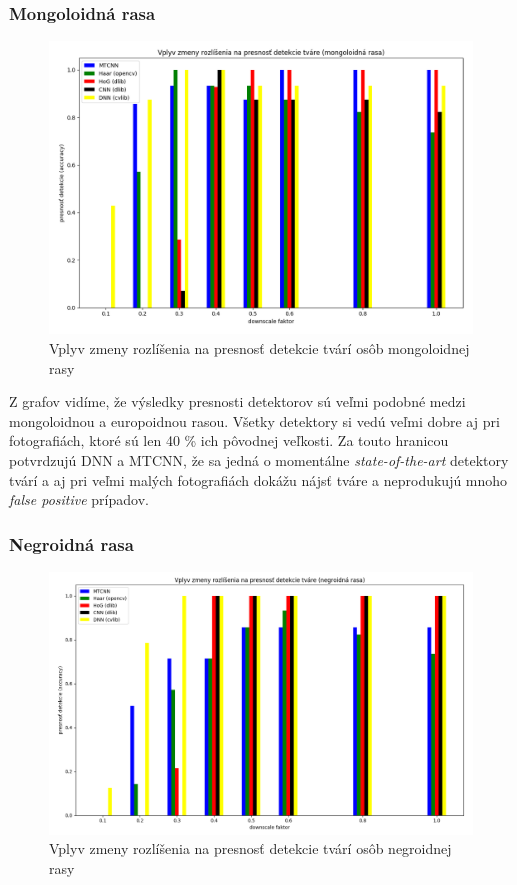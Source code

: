 \documentclass[]{article}
\begin{document}
	\newpage
	
	\subsubsection*{Mongoloidná rasa}
	\begin{figure}[h!]
		\includegraphics[width=\textwidth]{Vysledky_rozslisenie/mongo/Figure_1.png}
		\caption{Vplyv zmeny rozlíšenia na presnosť detekcie tvárí osôb mongoloidnej rasy}
	\end{figure}

	Z grafov vidíme, že výsledky presnosti detektorov sú veľmi podobné medzi mongoloidnou a europoidnou rasou. Všetky detektory si vedú veľmi dobre aj pri fotografiách, ktoré sú len 40 \% ich pôvodnej veľkosti. Za touto hranicou potvrdzujú DNN a MTCNN, že sa jedná o momentálne \textit{state-of-the-art} detektory tvárí a aj pri veľmi malých fotografiách dokážu nájsť tváre a neprodukujú mnoho \textit{false positive} prípadov.

	\newpage
	
	\subsubsection*{Negroidná rasa}
	\begin{figure}[h!]
		\includegraphics[width=\textwidth]{Vysledky_rozslisenie/negro/Figure_1.png}
		\caption{Vplyv zmeny rozlíšenia na presnosť detekcie tvárí osôb negroidnej rasy}
	\end{figure}
\end{document}
